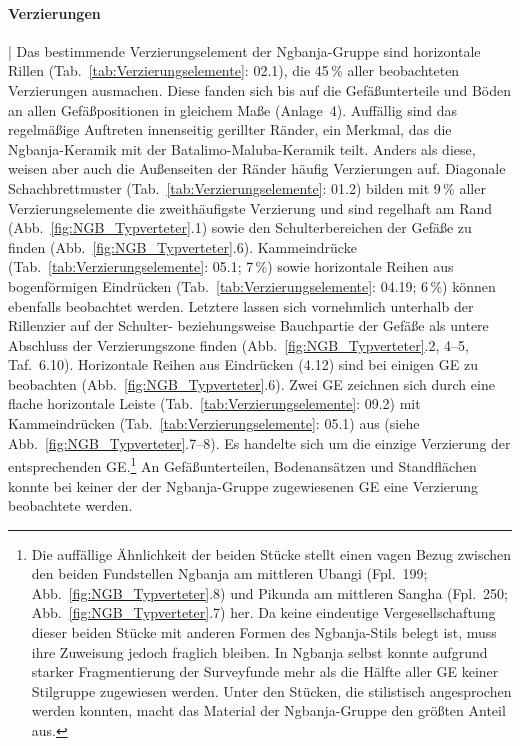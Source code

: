 \paragraph{Verzierungen}\hspace{-.5em}|\hspace{.5em}%
Das bestimmende Verzierungselement der \mbox{Ngbanja}-Gruppe sind horizontale Rillen (Tab.~\ref{tab:Verzierungselemente}: 02.1), die 45\,\% aller beobachteten Verzierungen ausmachen. Diese fanden sich bis auf die Gefäßunterteile und Böden an allen Gefäßpositionen in gleichem Maße (Anlage~4). Auffällig sind das regelmäßige Auftreten innenseitig gerillter Ränder, ein Merkmal, das die \mbox{Ngbanja}-Keramik mit der Batalimo-Maluba-Keramik teilt. Anders als diese, weisen aber auch die Außenseiten der Ränder häufig Verzierungen auf. Diagonale Schachbrettmuster (Tab.~\ref{tab:Verzierungselemente}: 01.2) bilden mit 9\,\% aller Verzierungselemente die zweithäufigste Verzierung und sind regelhaft am Rand (Abb.~\ref{fig:NGB_Typverteter}.1) sowie den Schulterbereichen der Gefäße zu finden (Abb.~\ref{fig:NGB_Typverteter}.6). Kammeindrücke (Tab.~\ref{tab:Verzierungselemente}: 05.1; 7\,\%) sowie horizontale Reihen aus bogenförmigen Eindrücken (Tab.~\ref{tab:Verzierungselemente}: 04.19; 6\,\%) können ebenfalls beobachtet werden. Letztere lassen sich vornehmlich unterhalb der Rillenzier auf der Schulter- beziehungsweise Bauchpartie der Gefäße als untere Abschluss der Verzierungszone finden (Abb.~\ref{fig:NGB_Typverteter}.2, 4--5, Taf.~6.10). Horizontale Reihen aus Eindrücken (4.12) sind bei einigen GE zu beobachten (Abb.~\ref{fig:NGB_Typverteter}.6). Zwei GE zeichnen sich durch eine flache horizontale Leiste (Tab.~\ref{tab:Verzierungselemente}: 09.2) mit Kammeindrücken (Tab.~\ref{tab:Verzierungselemente}: 05.1) aus (siehe Abb.~\ref{fig:NGB_Typverteter}.7--8). Es handelte sich um die einzige Verzierung der entsprechenden GE.\footnote{Die auffällige Ähnlichkeit der beiden Stücke stellt einen vagen Bezug zwischen den beiden Fundstellen \mbox{Ngbanja} am mittleren \mbox{Ubangi} (Fpl.~199; Abb.~\ref{fig:NGB_Typverteter}.8) und Pikunda am mittleren \mbox{Sangha} (Fpl.~250; Abb.~\ref{fig:NGB_Typverteter}.7) her. Da keine eindeutige Vergesellschaftung dieser beiden Stücke mit anderen Formen des \mbox{Ngbanja}-Stils belegt ist, muss ihre Zuweisung jedoch fraglich bleiben. In \mbox{Ngbanja} selbst konnte aufgrund starker Fragmentierung der Surveyfunde mehr als die Hälfte aller GE keiner Stilgruppe zugewiesen werden. Unter den Stücken, die stilistisch angesprochen werden konnten, macht das Material der \mbox{Ngbanja}-Gruppe den größten Anteil aus.} An Gefäßunterteilen, Bodenansätzen und Standflächen konnte bei keiner der der \mbox{Ngbanja}-Gruppe zugewiesenen GE eine Verzierung beobachtete werden. 


